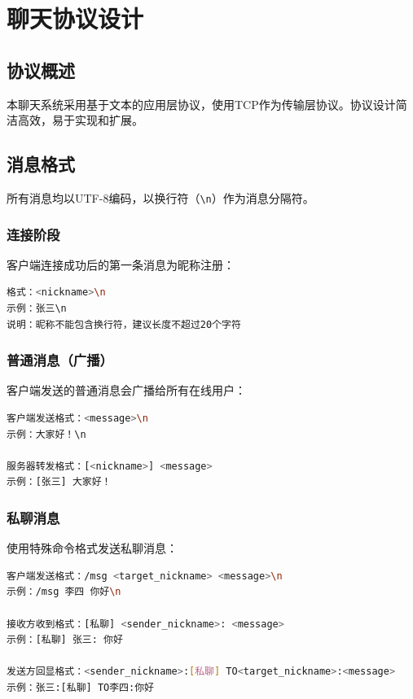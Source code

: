 \documentclass[12pt, a4paper]{article}
\newcommand{\cmd}[1]{\texttt{#1}}
\begin{document}
\section{聊天协议设计}

\subsection{协议概述}

本聊天系统采用基于文本的应用层协议，使用TCP作为传输层协议。协议设计简洁高效，易于实现和扩展。

\subsection{消息格式}

所有消息均以UTF-8编码，以换行符（\cmd{\textbackslash n}）作为消息分隔符。

\subsubsection{连接阶段}

客户端连接成功后的第一条消息为昵称注册：

\begin{lstlisting}[language=bash]
格式：<nickname>\n
示例：张三\n
说明：昵称不能包含换行符，建议长度不超过20个字符
\end{lstlisting}

\subsubsection{普通消息（广播）}

客户端发送的普通消息会广播给所有在线用户：

\begin{lstlisting}[language=bash]
客户端发送格式：<message>\n
示例：大家好！\n

服务器转发格式：[<nickname>] <message>
示例：[张三] 大家好！
\end{lstlisting}

\subsubsection{私聊消息}

使用特殊命令格式发送私聊消息：

\begin{lstlisting}[language=bash]
客户端发送格式：/msg <target_nickname> <message>\n
示例：/msg 李四 你好\n

接收方收到格式：[私聊] <sender_nickname>: <message>
示例：[私聊] 张三: 你好

发送方回显格式：<sender_nickname>:[私聊] TO<target_nickname>:<message>
示例：张三:[私聊] TO李四:你好
\end{lstlisting}
\end{document}
